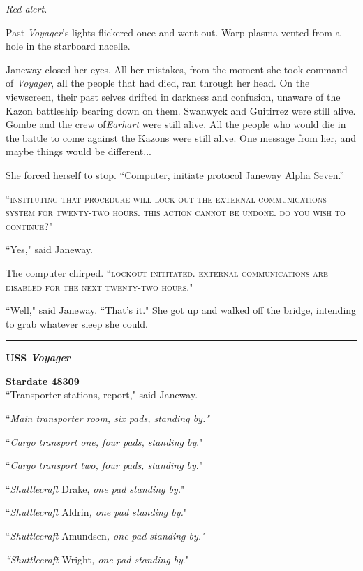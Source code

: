 \documentclass[twoside,letterpaper,12pt]{memoir}
\begin{document}
\textit{Red alert.} 

Past-\textit{Voyager}'s lights flickered once and went out. Warp plasma vented from a hole in the starboard nacelle. 

Janeway closed her eyes. All her mistakes, from the moment she took command of \textit{Voyager}, all the people that had died, ran through her head. On the viewscreen, their past selves drifted in darkness and confusion, unaware of the Kazon battleship bearing down on them. Swanwyck and Guitirrez were still alive. Gombe and the crew of\textit{Earhart }were still alive. All the people who would die in the battle to come against the Kazons were still alive. One message from her, and maybe things would be different...

She forced herself to stop. ``Computer, initiate protocol Janeway Alpha Seven.” 

``\textsc{instituting that procedure will lock out the external communications system for twenty-two hours. this action cannot be undone. do you wish to continue?}" 

``Yes," said Janeway. 

The computer chirped. ``\textsc{lockout inititated. external communications are disabled for the next twenty-two hours}." 

``Well," said Janeway. ``That's it." She got up and walked off the bridge, intending to grab whatever sleep she could. 

\begin{center}\rule{3cm}{0.4 pt}\end{center} 

\noindent\textbf{USS \textit{Voyager}} 

\noindent\textbf{Stardate 48309}\\

``Transporter stations, report," said Janeway. 

``\textit{Main transporter room, six pads, standing by."} 

``\textit{Cargo transport one, four pads, standing by}." 

``\textit{Cargo transport two, four pads, standing by}." 

``\textit{Shuttlecraft }Drake, \textit{one pad standing by.}" 

``\textit{Shuttlecraft }Aldrin\textit{, one pad standing by.}" 

``\textit{Shuttlecraft }Amundsen\textit{, one pad standing by."} 

\textit{``Shuttlecraft }Wright\textit{, one pad standing by}." 
\end{document}
